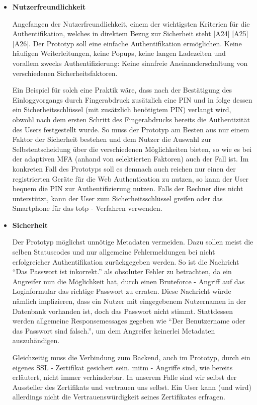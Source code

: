\begin{itemize} 
\item \textbf{Nutzerfreundlichkeit}

Angefangen der Nutzerfreundlichkeit, einem der wichtigsten Kriterien für die Authentifikation, welches in direktem Bezug zur Sicherheit steht [A24] [A25] [A26]. Der Prototyp soll eine einfache Authentifikation ermöglichen. Keine häufigen Weiterleitungen, keine Popups, keine langen Ladezeiten und vorallem zwecks Authentifizierung: Keine sinnfreie Aneinanderschaltung von verschiedenen Sicherheitsfaktoren.
\newpage

Ein Beispiel für solch eine Praktik wäre, dass nach der Bestätigung des Einloggvorgangs durch Fingerabdruck zusätzlich eine PIN und in folge dessen ein Sicherheitsschlüssel (mit zusätzlich benötigtem PIN) verlangt wird, obwohl nach dem ersten Schritt des Fingerabdrucks bereits die Authentizität des Users festgestellt wurde. So muss der Prototyp am Besten aus nur einem Faktor der Sicherheit bestehen und dem Nutzer die Auswahl zur Selbstentscheidung über die verschiedenen Möglichkeiten bieten, so wie es bei der adaptiven MFA (anhand von selektierten Faktoren) auch der Fall ist. Im konkreten Fall des Prototyps soll es demnach auch reichen nur einen der registrierten Geräte für die Web Authentication zu nutzen, so kann der User bequem die PIN zur Authentifizierung nutzen. Falls der Rechner dies nicht unterstützt, kann der User zum Sicherheitsschlüssel greifen oder das Smartphone für das \ac{totp} - Verfahren verwenden.

\item \textbf{Sicherheit}

Der Prototyp möglichst unnötige Metadaten vermeiden. Dazu sollen meist die selben Statuscodes und nur allgemeine Fehlermeldungen bei nicht erfolgreicher Authentifikation zurückgegeben werden. So ist die Nachricht ``Das Passwort ist inkorrekt.'' als obsoluter Fehler zu betrachten, da ein Angreifer nun die Möglichkeit hat, durch einen Bruteforce - Angriff auf das Loginformular das richtige Passwort zu erraten. Diese Nachricht würde nämlich implizieren, dass ein Nutzer mit eingegebenem Nutzernamen in der Datenbank vorhanden ist, doch das Passwort nicht stimmt. Stattdessen werden allgemeine Responsemessages gegeben wie ``Der Benutzername oder das Passwort sind falsch.'', um dem Angreifer keinerlei Metadaten auszuhändigen.

Gleichzeitig muss die Verbindung zum Backend, auch im Prototyp, durch ein eigenes SSL - Zertifikat gesichert sein. \ac{mitm} - Angriffe sind, wie bereits erläutert, nicht immer verhinderbar. In unserem Falle sind wir selbst der Aussteller des Zertifikats und vertrauen uns selbst. Ein User kann (und wird) allerdings nicht die Vertrauenswürdigkeit seines Zertifikates erfragen.


\end{itemize}
